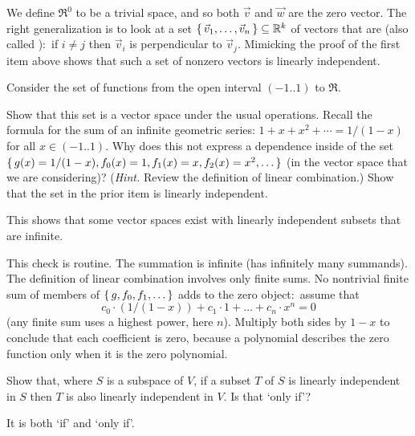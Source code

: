 \begin{exercises}
\begin{answer}
\begin{exparts}
           We define \( \Re^0 \) to be a trivial space, and so both $\vec{v}$
           and $\vec{w}$ are the zero vector.
         \partsitem The right generalization is to look at a set
           \( \mbox{$\{\,\vec{v}_1,\dots,\vec{v}_n\,\}$}\subseteq\mathbb{R}^k \) of vectors
           that are  
           (also called ):~if
           \( i\neq j \) then \( \vec{v}_i \) is perpendicular to
           \( \vec{v}_j \).
           Mimicking the proof of the first item above shows that such a set of
           nonzero vectors is linearly independent.
      \end{exparts}  
    \end{answer}
  \item 
    Consider the set of functions from the open interval $(-1..1)$ 
    to $\Re$.
    \begin{exparts}
      \partsitem Show that 
         this set is a vector space under the usual operations.
      \partsitem Recall the formula for the sum of an infinite geometric 
         series: 
         \( 1+x+x^2+\cdots=1/(1-x) \) for all \( x\in(-1..1) \).
         Why does this not express a dependence inside of
         the set $\mbox{$\{\,g(x)=1/(1-x),f_0(x)=1,f_1(x)=x,f_2(x)=x^2,\ldots\,\}$}$
         (in the vector space that we are considering)?
         (\textit{Hint.}
         Review the definition of linear combination.)
      \partsitem Show that the set in the prior item is linearly independent.
    \end{exparts}
    This shows that some vector spaces exist with linearly independent subsets
    that are infinite.
    \begin{answer}
      \begin{exparts}
        \partsitem This check is routine.
        \partsitem The summation is infinite (has infinitely many summands).
          The definition of linear combination involves only finite sums.
        \partsitem No nontrivial finite sum of members of 
           \( \mbox{$\{\,g,f_0,f_1,\ldots\,\}$} \) adds to the zero object:~assume that
           \begin{equation*}
              c_0\cdot (1/(1-x))+c_1\cdot 1+\dots+c_n\cdot x^n=0
           \end{equation*}
           (any finite sum uses a highest power, here \( n \)).
           Multiply both sides by \( 1-x \) to conclude that each coefficient 
           is zero, because a polynomial describes the zero function only when 
           it is the zero polynomial.
      \end{exparts}
     \end{answer}
  \item 
    Show that, where \( S \) is a subspace of \( V \), if a subset $T$ of
    \( S \) is linearly independent in \( S \) then $T$ is also linearly
    independent in \( V \).
    Is that `only if'?
    \begin{answer}
      It is both `if' and `only if'.


\end{answer}
\end{exercises}
